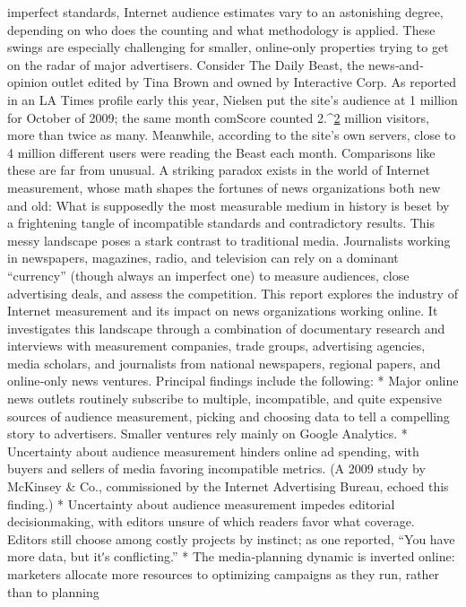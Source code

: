 imperfect standards, Internet audience estimates vary to an astonishing
degree, depending on who does the counting and what methodology is
applied. These swings are especially challenging for smaller, online‐only
properties trying to get on the radar of major advertisers.
Consider The Daily Beast, the news‐and‐opinion outlet edited by Tina
Brown and owned by Interactive Corp. As reported in an LA Times profile
early this year, Nielsen put the site’s audience at 1 million for October of
2009; the same month comScore counted 2.^{\href{#endnotes}{2}} million visitors, more than
twice as many. Meanwhile, according to the site’s own servers, close to 4
million different users were reading the Beast each month.
Comparisons like these are far from unusual. A striking paradox exists in
the world of Internet measurement, whose math shapes the fortunes of
news organizations both new and old: What is supposedly the most
measurable medium in history is beset by a frightening tangle of
incompatible standards and contradictory results.
This messy landscape poses a stark contrast to traditional media.
Journalists working in newspapers, magazines, radio, and television can
rely on a dominant ``currency'' (though always an imperfect one) to
measure audiences, close advertising deals, and assess the competition.
This report explores the industry of Internet measurement and its impact
on news organizations working online. It investigates this landscape
through a combination of documentary research and interviews with
measurement companies, trade groups, advertising agencies, media
scholars, and journalists from national newspapers, regional papers, and
online‐only news ventures. Principal findings include the following:
* Major online news outlets routinely subscribe to multiple, incompatible,
and quite expensive sources of audience measurement, picking and
choosing data to tell a compelling story to advertisers. Smaller ventures
rely mainly on Google Analytics.
* Uncertainty about audience measurement hinders online ad spending,
with buyers and sellers of media favoring incompatible metrics. (A 2009
study by McKinsey & Co., commissioned by the Internet Advertising
Bureau, echoed this finding.)
* Uncertainty about audience measurement impedes editorial decisionmaking,
with editors unsure of which readers favor what coverage.
Editors still choose among costly projects by instinct; as one reported,
``You have more data, but itʹs conflicting.''
* The media‐planning dynamic is inverted online: marketers allocate more
resources to optimizing campaigns as they run, rather than to planning
